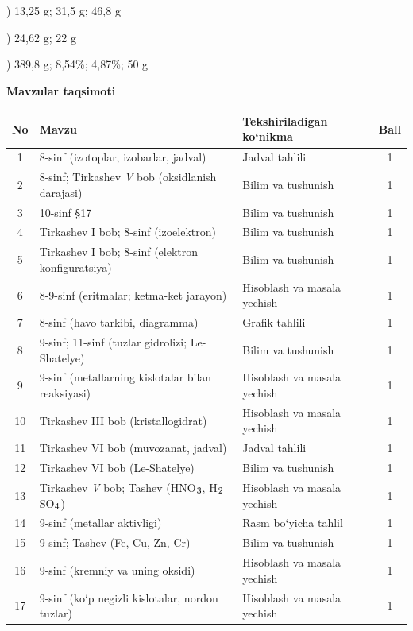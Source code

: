 \documentclass[11pt,a4paper]{article}
\renewcommand{\textsubscript}[1]{\ensuremath{_{\text{\fontsize{8}{8}\selectfont #1}}}}
\begin{document}
) 13,25 g; 31,5 g; 46,8 g\par
{}) 24,62 g; 22 g\par
{}) 389,8 g; 8,54\%; 4,87\%; 50 g\par
\par\bigskip\noindent\textbf{Mavzular taqsimoti}\par\smallskip
{\small\noindent\begin{longtable}{|c|p{7.2cm}|p{5.4cm}|c|}\hline \textbf{No} & \textbf{Mavzu} & \textbf{Tekshiriladigan ko`nikma} & \textbf{Ball}\\\hline
1 & 8-sinf (izotoplar, izobarlar, jadval) & Jadval tahlili & 1\\\hline
2 & 8-sinf; Tirkashev \textit{V} bob (oksidlanish darajasi) & Bilim va tushunish & 1\\\hline
3 & 10-sinf \S{}17 & Bilim va tushunish & 1\\\hline
4 & Tirkashev I bob; 8-sinf (izoelektron) & Bilim va tushunish & 1\\\hline
5 & Tirkashev I bob; 8-sinf (elektron konfiguratsiya) & Bilim va tushunish & 1\\\hline
6 & 8-9-sinf (eritmalar; ketma-ket jarayon) & Hisoblash va masala yechish & 1\\\hline
7 & 8-sinf (havo tarkibi, diagramma) & Grafik tahlili & 1\\\hline
8 & 9-sinf; 11-sinf (tuzlar gidrolizi; Le-Shatelye) & Bilim va tushunish & 1\\\hline
9 & 9-sinf (metallarning kislotalar bilan reaksiyasi) & Hisoblash va masala yechish & 1\\\hline
10 & Tirkashev III bob (kristallogidrat) & Hisoblash va masala yechish & 1\\\hline
11 & Tirkashev VI bob (muvozanat, jadval) & Jadval tahlili & 1\\\hline
12 & Tirkashev VI bob (Le-Shatelye) & Bilim va tushunish & 1\\\hline
13 & Tirkashev \textit{V} bob; Tashev (HNO\textsubscript{3}, H\textsubscript{2}SO\textsubscript{4}) & Hisoblash va masala yechish & 1\\\hline
14 & 9-sinf (metallar aktivligi) & Rasm bo`yicha tahlil & 1\\\hline
15 & 9-sinf; Tashev (Fe, Cu, Zn, Cr) & Bilim va tushunish & 1\\\hline
16 & 9-sinf (kremniy va uning oksidi) & Hisoblash va masala yechish & 1\\\hline
17 & 9-sinf (ko`p negizli kislotalar, nordon tuzlar) & Hisoblash va masala yechish & 1\\\hline

\end{longtable}}
\end{document}
